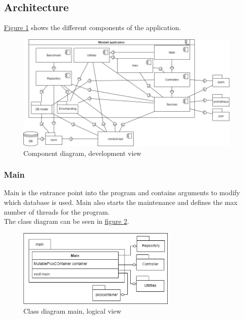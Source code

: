 \subsection{Architecture} %

\hyperref[fig:componentDiagram]{Figure \ref{fig:componentDiagram}} shows the different components of the application.

\begin{figure}[H]
    \centering
    \hspace*{-0.5in}
    \includegraphics[width=1.2\textwidth]{images/Diagrams-Development_view_component_diagram.jpg}
    \caption{Component diagram, development view}
    \label{fig:componentDiagram}
\end{figure}

\subsubsection{Main}
Main is the entrance point into the program and contains arguments to modify which database is used. Main also starts the maintenance and defines the max number of threads for the program.\\
The class diagram can be seen in \hyperref[fig:classDiagramMain]{figure \ref{fig:classDiagramMain}}.
\begin{figure}[H]
    \centering
    \includegraphics[width=0.7\textwidth]{images/class_diagram_main.jpg}
    \caption{Class diagram main, logical view}
    \label{fig:classDiagramMain}
\end{figure}

